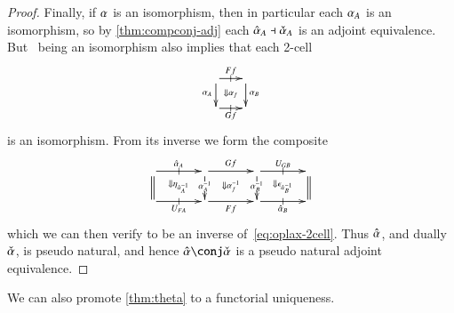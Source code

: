 \documentclass{amsart}
\begin{document}
\begin{proof}
  Finally, if $\alpha$ is an isomorphism, then in particular each $\alpha_A$
  is an isomorphism, so by \autoref{thm:compconj-adj} each
  $\hat{\alpha}_A\dashv \check{\alpha}_A$ is an adjoint equivalence.  But \al\ being
  an isomorphism also implies that each 2-cell
  \[\vcenter{\xymatrix@-.5pc{ \ar[r]|-@{|}^-{Ff} \ar[d]_{\al_A} \ar@{}[dr]|{\Downarrow\al_f} &  \ar[d]^{\al_B}\\
      \ar[r]|-@{|}_-{Gf} & }}\]
  is an isomorphism.  From its inverse we form the composite
  \[\vcenter{\xymatrix@R=1.5pc@C=3pc{
      \ar[r]|-@{|}^{\alhat_A}\ar@{=}[d] \ar@{}[dr]|{\Downarrow \eta_{\hat{\alpha}_A^{-1}}} &
      \ar[r]^{Gf}\ar[d]|{\al_A\inv} \ar@{}[dr]|{\Downarrow\al_f\inv} &
      \ar[r]|-@{|}^{U_{GB}}\ar[d]|{\al_B\inv} \ar@{}[dr]|{\Downarrow \epsilon_{\hat{\alpha}_B^{-1}}} &
      \ar@{=}[d]\\
      \ar[r]|-@{|}_{U_{FA}}&
      \ar[r]_{Ff} &
      \ar[r]|-@{|}_{\alhat_B} &
    }}\]
  which we can then verify to be an inverse of~\eqref{eq:oplax-2cell}.
  Thus $\hat{\alpha}$, and dually $\check{\alpha}$, is pseudo natural, and hence
  $\alhat\conj\alchk$ is a pseudo natural adjoint equivalence.
\end{proof}

We can also promote \autoref{thm:theta} to a functorial uniqueness.
\end{document}
